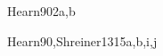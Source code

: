 \begin{syllabus}
\begin{unit}{\HCIProgrammingInteractiveSystems}{}{Hearn90}{2}{a,b}
    \begin{learningoutcomes}
    	\item \HCINewInteractiveTechnologiesLODiscussTheDisadvantages [\Assessment]
    \end{learningoutcomes}
\end{unit}

\begin{unit}{\GVGeometricModeling}{}{Hearn90,Shreiner13}{15}{a,b,i,j}
   \begin{topics} 
        \item \GVGeometricModelingTopicBasicGeometric
        \item \GVGeometricModelingTopicVolumes
        \item \GVGeometricModelingTopicParametric
        \item \GVGeometricModelingTopicImplicit
        \item \GVGeometricModelingTopicApproximation
        \item \GVGeometricModelingTopicSurface
        \item \GVGeometricModelingTopicSpatial
        \item \GVGeometricModelingTopicProcedural
        \item \GVGeometricModelingTopicElastically
        \item \GVGeometricModelingTopicSubdivision
        \item \GVGeometricModelingTopicMultiresolution
        \item \GVGeometricModelingTopicReconstruction
        \item \GVGeometricModelingTopicConstructive
   \end{topics}

   \begin{learningoutcomes} 
		\item \GVGeometricModelingLORepresent [\Usage]
        \item \GVGeometricModelingLOCreateSimple [\Usage]
        \item \GVGeometricModelingLOGenerateA [\Usage]
        \item \GVGeometricModelingLOGenerateAData [\Usage]
        \item \GVGeometricModelingLOConstructCsg [\Usage]
        \item \GVGeometricModelingLOContrastModeling [\Assessment]
   \end{learningoutcomes}
\end{unit}


\end{syllabus}
